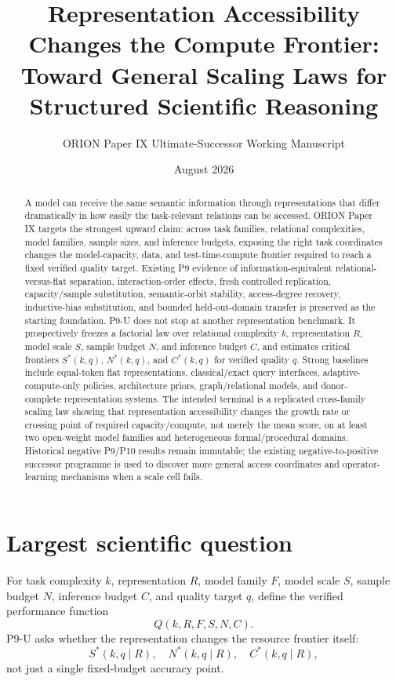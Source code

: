 \documentclass[11pt]{article}
\title{Representation Accessibility Changes the Compute Frontier:\\
Toward General Scaling Laws for Structured Scientific Reasoning}
\author{ORION Paper IX Ultimate-Successor Working Manuscript}
\date{August 2026}
\begin{document}
\maketitle

\begin{abstract}
A model can receive the same semantic information through representations that differ dramatically in how easily the task-relevant relations can be accessed. ORION Paper IX targets the strongest upward claim: across task families, relational complexities, model families, sample sizes, and inference budgets, exposing the right task coordinates changes the model-capacity, data, and test-time-compute frontier required to reach a fixed verified quality target. Existing P9 evidence of information-equivalent relational-versus-flat separation, interaction-order effects, fresh controlled replication, capacity/sample substitution, semantic-orbit stability, access-degree recovery, inductive-bias substitution, and bounded held-out-domain transfer is preserved as the starting foundation. P9-U does not stop at another representation benchmark. It prospectively freezes a factorial law over relational complexity $k$, representation $R$, model scale $S$, sample budget $N$, and inference budget $C$, and estimates critical frontiers $S^*(k,q)$, $N^*(k,q)$, and $C^*(k,q)$ for verified quality $q$. Strong baselines include equal-token flat representations, classical/exact query interfaces, adaptive-compute-only policies, architecture priors, graph/relational models, and donor-complete representation systems. The intended terminal is a replicated cross-family scaling law showing that representation accessibility changes the growth rate or crossing point of required capacity/compute, not merely the mean score, on at least two open-weight model families and heterogeneous formal/procedural domains. Historical negative P9/P10 results remain immutable; the existing negative-to-positive successor programme is used to discover more general access coordinates and operator-learning mechanisms when a scale cell fails.
\end{abstract}

\section{Largest scientific question}
For task complexity $k$, representation $R$, model family $F$, model scale $S$, sample budget $N$, inference budget $C$, and quality target $q$, define the verified performance function
\[
Q(k,R,F,S,N,C).
\]
P9-U asks whether the representation changes the resource frontier itself:
\[
S^*(k,q\mid R),\quad N^*(k,q\mid R),\quad C^*(k,q\mid R),
\]
not just a single fixed-budget accuracy point.
\end{document}
